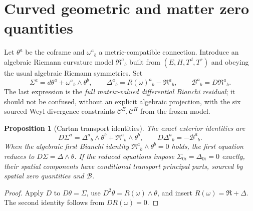 \documentclass[11pt,a4paper]{article}
\newtheorem{proposition}[theorem]{Proposition}
\newcommand{\cC}{\mathcal C}
\newcommand{\cB}{\mathcal B}
\begin{document}
\section{Curved geometric and matter zero quantities}
Let $\theta^a$ be the coframe and $\omega^a{}_b$ a metric-compatible connection. Introduce an algebraic Riemann curvature model $\mathfrak R^a{}_b$ built from $(E,H,T^d,T^r)$ and obeying the usual algebraic Riemann symmetries. Set
\begin{equation}\label{eq:zero}
\Sigma^a=d\theta^a+\omega^a{}_b\wedge\theta^b,\qquad
\Delta^a{}_b=R(\omega)^a{}_b-\mathfrak R^a{}_b,\qquad
\cB^a{}_b=D\mathfrak R^a{}_b.
\end{equation}
The last expression is the \emph{full matrix-valued differential Bianchi residual}; it should not be confused, without an explicit algebraic projection, with the six sourced Weyl divergence constraints $\cC^E,\cC^H$ from the frozen model.

\begin{proposition}[Cartan transport identities]\label{prop:cartan}
The exact exterior identities are
\begin{equation}\label{eq:cartan}
D\Sigma^a=\Delta^a{}_b\wedge\theta^b
+\mathfrak R^a{}_b\wedge\theta^b,\qquad
D\Delta^a{}_b=-\cB^a{}_b.
\end{equation}
When the algebraic first Bianchi identity $\mathfrak R^a{}_b\wedge\theta^b=0$ holds, the first equation reduces to $D\Sigma=\Delta\wedge\theta$. If the reduced equations impose $\Sigma_{0i}=\Delta_{0i}=0$ exactly, their spatial components have conditional transport principal parts, sourced by spatial zero quantities and $\cB$.
\end{proposition}
\begin{proof}Apply $D$ to $D\theta=\Sigma$, use $D^2\theta=R(\omega)\wedge\theta$, and insert $R(\omega)=\mathfrak R+\Delta$. The second identity follows from $DR(\omega)=0$.\end{proof}
\end{document}
